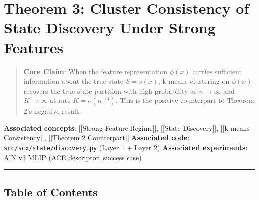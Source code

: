 \documentclass[
  12pt,
]{article}
\author{SCX}
\date{2026}
\begin{document}
\section{Theorem 3: Cluster Consistency of State Discovery Under Strong
Features}\label{theorem-3-cluster-consistency-of-state-discovery-under-strong-features}

\begin{quote}
\textbf{Core Claim}: When the feature representation \(\phi(x)\) carries
sufficient information about the true state \(S = s(x)\), k-means
clustering on \(\phi(x)\) recovers the true state partition with high
probability as \(n \to \infty\) and \(K \to \infty\) at rate
\(K = o(n^{1/3})\). This is the positive counterpart to Theorem 2's
negative result.
\end{quote}

\textbf{Associated concepts}: {[}{[}Strong Feature Regime{]}{]},
{[}{[}State Discovery{]}{]}, {[}{[}k-means Consistency{]}{]},
{[}{[}Theorem 2 Counterpart{]}{]} \textbf{Associated code}:
\texttt{src/scx/state/discovery.py} (Layer 1 + Layer 2)
\textbf{Associated experiments}: AlN v3 MLIP (ACE descriptor, success
case)

\begin{center}\rule{0.5\linewidth}{0.5pt}\end{center}

\subsection{Table of Contents}\label{table-of-contents}
\end{document}
